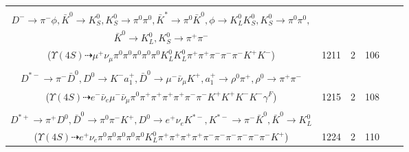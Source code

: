 \documentclass[landscape]{article}
\newcounter{rownumbers}
\newcommand\rn{\stepcounter{rownumbers}\arabic{rownumbers}}
\newcommand{\EOLP}{\\ \hline} %
\newcommand{\topoTags}[1]{#1} %
\begin{document}
\begin{longtable}{clcccc}
\rn & \makecell[l]{ $ 
\Upsilon(4S) \rightarrow B^{0} \bar{B}^{0} ,
B^{0} \rightarrow \rho^{0} K^{0} D^{+} D^{-} ,
\bar{B}^{0} \rightarrow \bar{K}^{0} K^{+} K^{-} ,
\rho^{0} \rightarrow \pi^{+} \pi^{-} ,
K^{0} \rightarrow K_{S}^{0} ,
D^{+} \rightarrow \mu^{+} \nu_{\mu} \bar{K}^{*} ,
$ \\ $
D^{-} \rightarrow \pi^{-} \phi ,
\bar{K}^{0} \rightarrow K_{S}^{0} ,
K_{S}^{0} \rightarrow \pi^{0} \pi^{0} ,
\bar{K}^{*} \rightarrow \pi^{0} \bar{K}^{0} ,
\phi \rightarrow K_{L}^{0} K_{S}^{0} ,
K_{S}^{0} \rightarrow \pi^{0} \pi^{0} ,
$ \\ $
\bar{K}^{0} \rightarrow K_{L}^{0} ,
K_{S}^{0} \rightarrow \pi^{+} \pi^{-} 
$ \\ ($
\Upsilon(4S) \dashrightarrow \mu^{+} \nu_{\mu} \pi^{0} \pi^{0} \pi^{0} \pi^{0} \pi^{0} K_{L}^{0} K_{L}^{0} \pi^{+} \pi^{+} \pi^{-} \pi^{-} \pi^{-} K^{+} K^{-} 
$) } & \topoTags{1211 & }2 & 106 \EOLP

\rn & \makecell[l]{ $ 
\Upsilon(4S) \rightarrow B^{0} \bar{B}^{0} ,
B^{0} \rightarrow \pi^{0} \bar{D}^{0} ,
\bar{B}^{0} \rightarrow \bar{K}^{*} D^{*+} D^{*-} ,
\bar{D}^{0} \rightarrow e^{-} \bar{\nu}_{e} K^{+} ,
\bar{K}^{*} \rightarrow \pi^{+} K^{-} \gamma^{F} ,
D^{*+} \rightarrow \pi^{+} D^{0} ,
$ \\ $
D^{*-} \rightarrow \pi^{-} \bar{D}^{0} ,
D^{0} \rightarrow K^{-} a_{1}^{+} ,
\bar{D}^{0} \rightarrow \mu^{-} \bar{\nu}_{\mu} K^{+} ,
a_{1}^{+} \rightarrow \rho^{0} \pi^{+} ,
\rho^{0} \rightarrow \pi^{+} \pi^{-} 
$ \\ ($
\Upsilon(4S) \dashrightarrow e^{-} \bar{\nu}_{e} \mu^{-} \bar{\nu}_{\mu} \pi^{0} \pi^{+} \pi^{+} \pi^{+} \pi^{+} \pi^{-} \pi^{-} K^{+} K^{+} K^{-} K^{-} \gamma^{F} 
$) } & \topoTags{1215 & }2 & 108 \EOLP

\rn & \makecell[l]{ $ 
\Upsilon(4S) \rightarrow B^{0} \bar{B}^{0} ,
B^{0} \rightarrow \pi^{0} \bar{D}^{*0} ,
\bar{B}^{0} \rightarrow \pi^{0} \rho^{0} \pi^{+} \pi^{-} \pi^{-} \eta D^{*+} ,
\bar{D}^{*0} \rightarrow \pi^{0} \bar{D}^{0} ,
\rho^{0} \rightarrow \pi^{+} \pi^{-} ,
\eta \rightarrow \pi^{0} \pi^{+} \pi^{-} ,
$ \\ $
D^{*+} \rightarrow \pi^{+} D^{0} ,
\bar{D}^{0} \rightarrow \pi^{0} \pi^{-} K^{+} ,
D^{0} \rightarrow e^{+} \nu_{e} K^{*-} ,
K^{*-} \rightarrow \pi^{-} \bar{K}^{0} ,
\bar{K}^{0} \rightarrow K_{L}^{0} 
$ \\ ($
\Upsilon(4S) \dashrightarrow e^{+} \nu_{e} \pi^{0} \pi^{0} \pi^{0} \pi^{0} \pi^{0} K_{L}^{0} \pi^{+} \pi^{+} \pi^{+} \pi^{+} \pi^{-} \pi^{-} \pi^{-} \pi^{-} \pi^{-} \pi^{-} K^{+} 
$) } & \topoTags{1224 & }2 & 110 \EOLP


\end{longtable}
\end{document}
